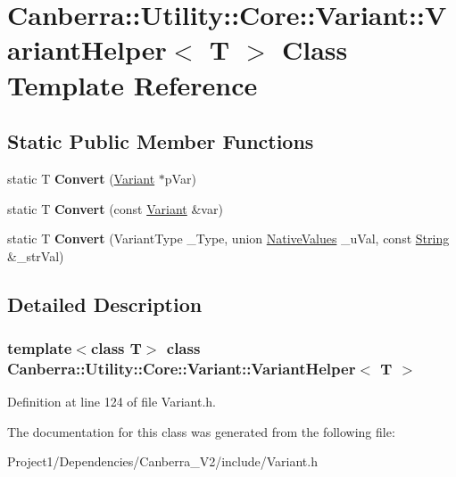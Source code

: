 \hypertarget{class_canberra_1_1_utility_1_1_core_1_1_variant_1_1_variant_helper}{}\section{Canberra\+:\+:Utility\+:\+:Core\+:\+:Variant\+:\+:Variant\+Helper$<$ T $>$ Class Template Reference}
\label{class_canberra_1_1_utility_1_1_core_1_1_variant_1_1_variant_helper}
\subsection*{Static Public Member Functions}
\begin{DoxyCompactItemize}
\item 
\mbox{\label{class_canberra_1_1_utility_1_1_core_1_1_variant_1_1_variant_helper_a5869b267e5a5fb7ea8c1fa2783eef70e}} 
static T {\bfseries Convert} (\hyperlink{class_canberra_1_1_utility_1_1_core_1_1_variant}{Variant} $\ast$p\+Var)
\item 
\mbox{\label{class_canberra_1_1_utility_1_1_core_1_1_variant_1_1_variant_helper_a943666de3156182ae40229f6412be4e0}} 
static T {\bfseries Convert} (const \hyperlink{class_canberra_1_1_utility_1_1_core_1_1_variant}{Variant} \&var)
\item 
\mbox{\label{class_canberra_1_1_utility_1_1_core_1_1_variant_1_1_variant_helper_a1231b380cb56127a187794d155df70e1}} 
static T {\bfseries Convert} (Variant\+Type \+\_\+\+Type, union \hyperlink{class_canberra_1_1_utility_1_1_core_1_1_variant_de/db0/union_canberra_1_1_utility_1_1_core_1_1_variant_1_1_native_values}{Native\+Values} \+\_\+u\+Val, const \hyperlink{class_canberra_1_1_utility_1_1_core_1_1_string}{String} \&\+\_\+str\+Val)
\end{DoxyCompactItemize}


\subsection{Detailed Description}
\subsubsection*{template$<$class T$>$\newline
class Canberra\+::\+Utility\+::\+Core\+::\+Variant\+::\+Variant\+Helper$<$ T $>$}



Definition at line 124 of file Variant.\+h.



The documentation for this class was generated from the following file\+:\begin{DoxyCompactItemize}
\item 
Project1/\+Dependencies/\+Canberra\+\_\+\+V2/include/Variant.\+h\end{DoxyCompactItemize}

